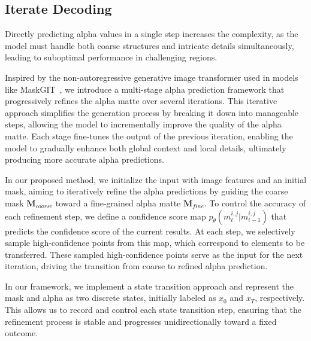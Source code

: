 \subsection{Iterate Decoding}
\label{sec:iter}
Directly predicting alpha values in a single step increases the complexity, as the model must handle both coarse structures and intricate details simultaneously, leading to suboptimal performance in challenging regions.

Inspired by the non-autoregressive generative image transformer used in models like MaskGIT~\cite{maskgit}, we introduce a multi-stage alpha prediction framework that progressively refines the alpha matte over several iterations. This iterative approach simplifies the generation process by breaking it down into manageable steps, allowing the model to incrementally improve the quality of the alpha matte. Each stage fine-tunes the output of the previous iteration, enabling the model to gradually enhance both global context and local details, ultimately producing more accurate alpha predictions.

In our proposed method, we initialize the input with image features and an initial mask, aiming to iteratively refine the alpha predictions by guiding the coarse mask \(\mathbf{M}_{coarse}\) toward a fine-grained alpha matte \(\mathbf{M}_{fine}\). To control the accuracy of each refinement step, we define a confidence score map \( p_\theta(m_{t}^{i,j}|m_{t-1}^{i,j}) \) that predicts the confidence score of the current results. At each step, we selectively sample high-confidence points from this map, which correspond to elements to be transferred. These sampled high-confidence points serve as the input for the next iteration, driving the transition from coarse to refined alpha prediction.

 In our framework, we implement a state transition approach and represent the mask and alpha as two discrete states, initially labeled as \(x_{0}\) and \(x_{T}\), respectively. This allows us to record and control each state transition step, ensuring that the refinement process is stable and progresses unidirectionally toward a fixed outcome.

